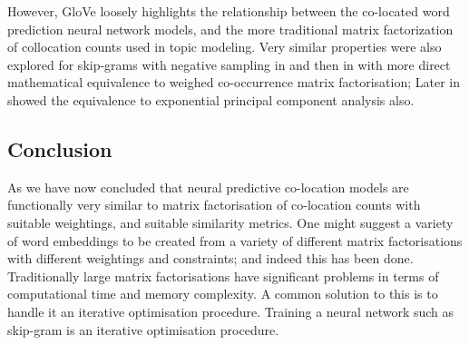 \documentclass[parskip]{komatufte}
\begin{document}

However, GloVe loosely highlights the relationship between the co-located word prediction neural network models,
and the more traditional matrix factorization of collocation counts used in topic modeling.
Very similar properties were also explored for skip-grams with negative sampling in  and then in  with more direct mathematical equivalence to weighed co-occurrence matrix factorisation;
Later in  showed the equivalence to exponential principal component analysis also.



\subsection{Conclusion}
As we have now concluded that neural predictive co-location models are functionally very similar to matrix factorisation of co-location counts with suitable weightings, and suitable similarity metrics.
One might suggest a variety of word embeddings to be created from a variety of different matrix factorisations with different weightings and constraints; and indeed this has been done.
Traditionally large matrix factorisations have significant problems in terms of computational time and memory complexity.
A common solution to this is to handle it an iterative optimisation procedure.
Training a neural network such as skip-gram is an iterative optimisation procedure.
\end{document}
